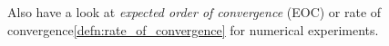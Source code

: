 \begin{notebox}[Note]\nospacing
    Also have a look at \textit{expected order of convergence} (EOC) or rate of convergence\cref{defn:rate_of_convergence} for numerical experiments.
\end{notebox}
